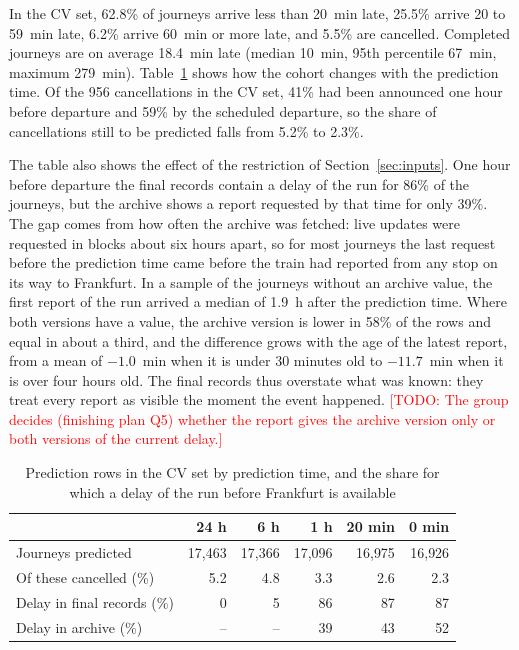 \documentclass[conference]{IEEEtran}
\newcommand{\todo}[1]{\textcolor{red}{[TODO: #1]}}
\begin{document}
In the CV set, 62.8\% of journeys arrive less than 20~min late, 25.5\% arrive 20 to 59~min late,
6.2\% arrive 60~min or more late, and 5.5\% are cancelled. Completed journeys are on average
18.4~min late (median 10~min, 95th percentile 67~min, maximum 279~min). Table~\ref{tab:data} shows
how the cohort changes with the prediction time. Of the 956 cancellations in the CV set, 41\% had
been announced one hour before departure and 59\% by the scheduled departure, so the share of
cancellations still to be predicted falls from 5.2\% to 2.3\%.

The table also shows the effect of the restriction of Section~\ref{sec:inputs}. One hour before
departure the final records contain a delay of the run for 86\% of the journeys, but the archive
shows a report requested by that time for only 39\%. The gap comes from how often the archive was
fetched: live updates were requested in blocks about six hours apart, so for most journeys the last
request before the prediction time came before the train had reported from any stop on its way to
Frankfurt. In a sample of the journeys without an archive value, the first report of the run arrived
a median of 1.9~h after the prediction time. Where both versions have a value, the archive version is
lower in 58\% of the rows and equal in about a third, and the difference grows with the age of the
latest report, from a mean of $-1.0$~min when it is under 30 minutes old to $-11.7$~min when it is
over four hours old. The final records thus overstate what was known: they treat every report as
visible the moment the event happened. \todo{The group decides (finishing plan Q5) whether the report gives the
archive version only or both versions of the current delay.}

\begin{table}[t]
\caption{Prediction rows in the CV set by prediction time, and the share for which a delay of the
run before Frankfurt is available}
\label{tab:data}
\centering
\footnotesize
\setlength{\tabcolsep}{3.5pt}
\begin{tabular}{@{}lrrrrr@{}}
\toprule
 & 24 h & 6 h & 1 h & 20 min & 0 min \\
\midrule
Journeys predicted & 17{,}463 & 17{,}366 & 17{,}096 & 16{,}975 & 16{,}926 \\
Of these cancelled (\%) & 5.2 & 4.8 & 3.3 & 2.6 & 2.3 \\
Delay in final records (\%) & 0 & 5 & 86 & 87 & 87 \\
Delay in archive (\%) & -- & -- & 39 & 43 & 52 \\
\bottomrule
\end{tabular}
\end{table}
\end{document}
